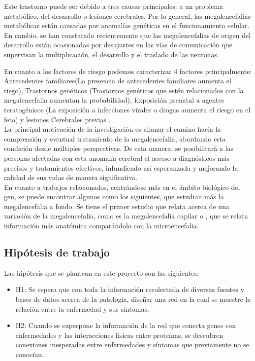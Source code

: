 Este trastorno puede ser debido a tres causas principales: a un problema metabólico, del desarrollo o lesiones cerebrales. Por lo general, las megalencefalias metabólicas están causadas por anomalías genéticas en el funcionamiento celular. En cambio, se han constatado recientemente \cite{winden_megalencephaly_2015} que las megalencefalias de origen del desarrollo están ocasionadas por desajustes en las vías de comunicación que supervisan la multiplicación, el desarrollo y el traslado de las neuronas.

En cuanto a los factores de riesgo podemos caracterizar 4 factores principalmente: Antecedentes familiares(La presencia de antecedentes familiares aumenta el riego), Trastornos genéticos (Trastornos genéticos que estén relacionados con la megalencefalia aumentan la probabilidad), Exposición prenatal a agentes teratogénicos (La exposición a infecciones virales o drogas aumenta el riesgo en el feto) y lesiones Cerebrales previas \cite{winden_megalencephaly_2015}. \\

La principal motivación de la investigación es allanar el camino hacia la comprensión y eventual tratamiento de la megalencefalia, abordando esta condición desde múltiples perspectivas. De esta manera, se posibilitará a las personas afectadas con esta anomalía cerebral el acceso a diagnósticos más precisos y tratamientos efectivos, infundiendo así esperanzada y mejorando la calidad de sus vidas de manera significativa.\\


En cuanto a trabajos relacionados, centrándose más en el ámbito biológico del gen, se puede encontrar algunos como los siguientes, que estudian más la megalencefalia a fondo. Se tiene el primer estudio que relata acerca de una variación de la megalencefalia, como es la megalencefalia capilar \cite{mirzaa_megalencephaly-capillary_2012} o \cite{pirozzi_microcephaly_2018}, que se relata información más anatómica comparándolo con la microencefalia.


\subsection{Hipótesis de trabajo}

Las hipótesis que se plantean en este proyecto son las siguientes:  

\begin{itemize}
	\item H1: Se espera que con toda la información recolectada de diversas fuentes y bases de datos acerca de la patología, diseñar una red en la cual se muestre la relación entre la enfermedad y sus síntomas.
	
	\item H2: Cuando se superpone la información de la red que conecta genes con enfermedades y las interacciones físicas entre proteínas, se descubren conexiones inesperadas entre enfermedades y síntomas que previamente no se conocían.
	
\end{itemize}


